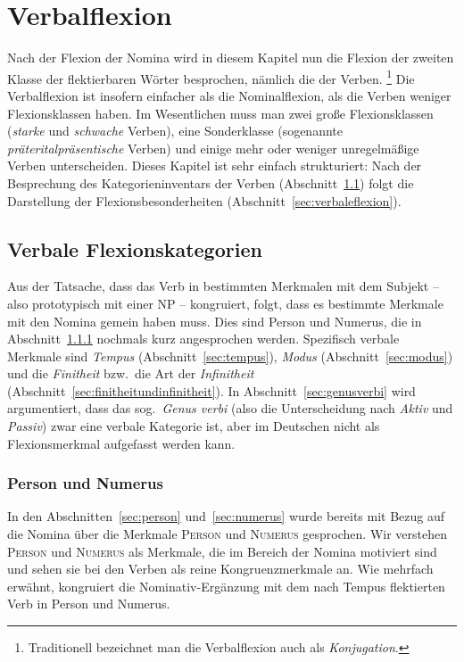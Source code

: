 \chapter{Verbalflexion}
\label{sec:verbalflexion}

Nach der Flexion der Nomina wird in diesem Kapitel nun die Flexion der zweiten Klasse der flektierbaren Wörter besprochen, nämlich die der Verben.%
\footnote{Traditionell bezeichnet man die Verbalflexion auch als \textit{Konjugation}.}
Die Verbalflexion ist insofern einfacher als die Nominalflexion, als die Verben weniger Flexionsklassen haben.
Im Wesentlichen muss man zwei große Flexionsklassen (\textit{starke} und \textit{schwache} Verben), eine Sonderklasse (sogenannte \textit{präteritalpräsentische} Verben) und einige mehr oder weniger unregelmäßige Verben unterscheiden.
Dieses Kapitel ist sehr einfach strukturiert:
Nach der Besprechung des Kategorieninventars der Verben (Abschnitt~\ref{sec:verbaleflexionskategorien}) folgt die Darstellung der Flexionsbesonderheiten (Abschnitt~\ref{sec:verbaleflexion}).

\section{Verbale Flexionskategorien}
\label{sec:verbaleflexionskategorien}

Aus der Tatsache, dass das Verb in bestimmten Merkmalen mit dem Subjekt -- also prototypisch mit einer NP -- kongruiert, folgt, dass es bestimmte Merkmale mit den Nomina gemein haben muss.
Dies sind Person und Numerus, die in Abschnitt~\ref{sec:personundnumerus} nochmals kurz angesprochen werden.
Spezifisch verbale Merkmale sind \textit{Tempus} (Abschnitt~\ref{sec:tempus}), \textit{Modus} (Abschnitt~\ref{sec:modus}) und die \textit{Finitheit} bzw.\ die Art der \textit{Infinitheit} (Abschnitt~\ref{sec:finitheitundinfinitheit}).
In Abschnitt~\ref{sec:genusverbi} wird argumentiert, dass das sog.\ \textit{Genus verbi} (also die Unterscheidung nach \textit{Aktiv} und \textit{Passiv}) zwar eine verbale Kategorie ist, aber im Deutschen nicht als Flexionsmerkmal aufgefasst werden kann.

\subsection{Person und Numerus}
\label{sec:personundnumerus}


In den Abschnitten~\ref{sec:person} und~\ref{sec:numerus} wurde bereits mit Bezug auf die Nomina über die Merkmale \textsc{Person} und \textsc{Numerus} gesprochen.
Wir verstehen \textsc{Person} und \textsc{Numerus} als Merkmale, die im Bereich der Nomina motiviert sind und sehen sie bei den Verben als reine Kongruenzmerkmale an.
Wie mehrfach erwähnt, kongruiert die Nominativ-Ergänzung mit dem nach Tempus flektierten Verb in Person und Numerus.

